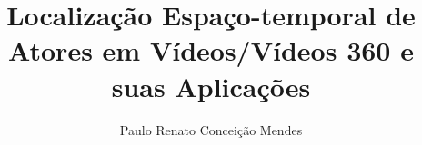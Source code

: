 \documentclass[phd,american]{ThesisPUC}
\author{Paulo Renato Conceição Mendes}
\title{Localização Espaço-temporal de Atores em Vídeos/Vídeos 360 e suas Aplicações}
\begin{document}








\arial


%


\end{document}
